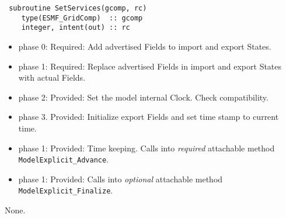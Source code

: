 \begin{verbatim} subroutine SetServices(gcomp, rc)
    type(ESMF_GridComp)  :: gcomp
    integer, intent(out) :: rc
\end{verbatim} 

\begin{itemize}
\item phase 0: {\sc Required:} Add advertised Fields to import and export States.
\item phase 1: {\sc Required:} Replace advertised Fields in import and export States with actual Fields.
\item phase 2: {\sc Provided:} Set the model internal Clock. Check compatibility.
\item phase 3. {\sc Provided:} Initialize export Fields and set time stamp to current time.
\end{itemize}

\begin{itemize}
\item phase 1: {\sc Provided:} Time keeping. Calls into {\em required} attachable method {\tt ModelExplicit\_Advance}.
\end{itemize}

\begin{itemize}
\item phase 1: {\sc Provided:} Calls into {\em optional} attachable method {\tt ModelExplicit\_Finalize}.
\end{itemize}

{\sc None.}

